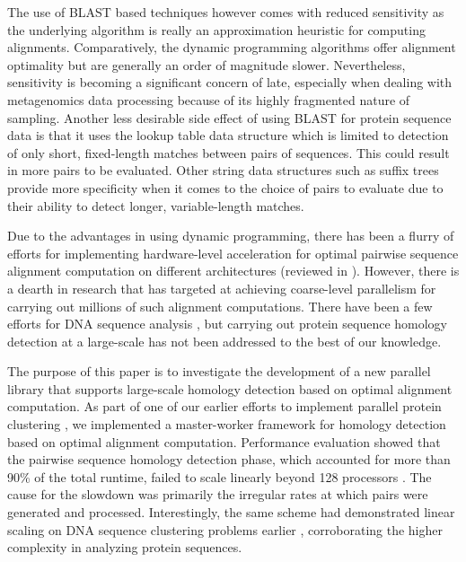 \documentclass[10pt,journal,letterpaper,compsoc]{IEEEtran}
\begin{document}
The use of BLAST based techniques however comes with reduced sensitivity \cite{Pearson91,Shpaer96} as the underlying algorithm is really an approximation heuristic for computing alignments. Comparatively, the dynamic programming algorithms offer alignment optimality but are generally an order of magnitude slower. Nevertheless, sensitivity is becoming a significant concern of late, especially when dealing with metagenomics data processing because of its highly fragmented nature of sampling. Another less desirable side effect of using BLAST for protein sequence data is that it uses the lookup table data structure which is limited to detection of only short, fixed-length matches between pairs of sequences. This could result in more pairs to be evaluated. Other string data structures such as suffix trees provide more specificity when it comes to the choice of pairs to evaluate due to their ability to detect longer, variable-length matches. 

Due to the advantages in using dynamic programming, there has been a flurry of efforts for implementing hardware-level acceleration for optimal pairwise sequence alignment computation on different architectures (reviewed in \cite{Sarkar10}). However, there is a dearth in research that has targeted at achieving coarse-level parallelism for carrying out millions of such alignment computations. There have been a few efforts for DNA sequence analysis \cite{KalyanaramanTPDS03,KalyanaramanJPDC07}, but carrying out protein sequence homology detection at a large-scale has not been addressed to the best of our knowledge.



The purpose of this paper is to investigate the development of a new parallel library that supports large-scale homology detection based on optimal alignment computation. As part of one of our earlier efforts to implement parallel protein clustering \cite{Wu08}, we implemented a master-worker framework for homology detection based on optimal alignment computation. Performance evaluation showed that the pairwise sequence homology detection phase, which accounted for more than 90\% of the total runtime, failed to scale linearly beyond 128 processors \cite{Wu08}. The cause for the slowdown was primarily the irregular rates at which pairs were generated and processed. Interestingly, the same scheme had demonstrated linear scaling on DNA sequence clustering problems earlier \cite{KalyanaramanTPDS03,KalyanaramanJPDC07}, corroborating the higher complexity in analyzing protein sequences.
\end{document}
